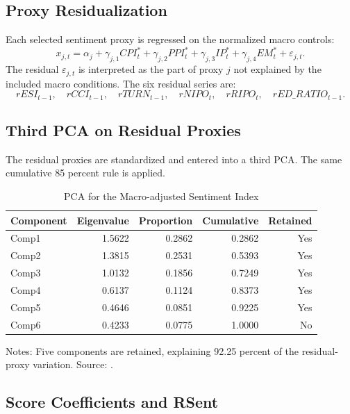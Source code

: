 \documentclass[12pt]{article}
\begin{document}
\subsection{Proxy Residualization}

Each selected sentiment proxy is regressed on the normalized macro controls:
\[
x_{j,t} = \alpha_j + \gamma_{j,1}CPI^{*}_t + \gamma_{j,2}PPI^{*}_t
 + \gamma_{j,3}IP^{*}_t + \gamma_{j,4}EM^{*}_t + \varepsilon_{j,t}.
\]
The residual \(\varepsilon_{j,t}\) is interpreted as the part of proxy \(j\) not explained by the included macro conditions. The six residual series are:
\[
rESI_{t-1},\quad rCCI_{t-1},\quad rTURN_{t-1},\quad rNIPO_t,\quad rRIPO_t,\quad rED\_RATIO_{t-1}.
\]

\subsection{Third PCA on Residual Proxies}

The residual proxies are standardized and entered into a third PCA. The same cumulative 85 percent rule is applied.

\begin{table}[htbp]
\centering
\caption{PCA for the Macro-adjusted Sentiment Index}
\label{tab:stage3_pca}
\begin{tabular}{lrrrr}
\toprule
Component & Eigenvalue & Proportion & Cumulative & Retained \\
\midrule
Comp1 & 1.5622 & 0.2862 & 0.2862 & Yes \\
Comp2 & 1.3815 & 0.2531 & 0.5393 & Yes \\
Comp3 & 1.0132 & 0.1856 & 0.7249 & Yes \\
Comp4 & 0.6137 & 0.1124 & 0.8373 & Yes \\
Comp5 & 0.4646 & 0.0851 & 0.9225 & Yes \\
Comp6 & 0.4233 & 0.0775 & 1.0000 & No \\
\bottomrule
\end{tabular}
\begin{minipage}{0.95\textwidth}
\footnotesize
Notes: Five components are retained, explaining 92.25 percent of the residual-proxy variation. Source: .
\end{minipage}
\end{table}

\subsection{Score Coefficients and RSent}
\end{document}
